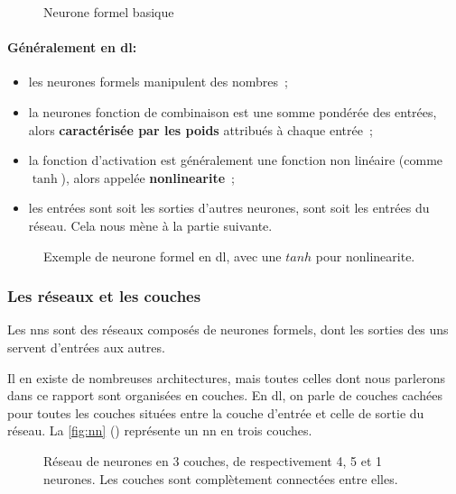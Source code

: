 \begin{figure}[h]
	\centering
	\scalebox{1}{}
	\caption{Neurone formel basique}
	\label{fig:formal_neuron}
\end{figure}

\paragraph{Généralement en \gls{dl}:}
\begin{itemize}
	\item les neurones formels manipulent des nombres~;
	\item la neurones fonction de combinaison est une somme pondérée des entrées, alors \textbf{caractérisée par les poids} attribués à chaque entrée~; \label{def:weight1}
	\item la fonction d'activation est généralement une fonction non linéaire (comme $\tanh$), alors appelée \textbf{\gls{nonlinearite}}~; \label{def:nonlinearite}
	\item les entrées sont soit les sorties d'autres neurones, sont soit les entrées du réseau. Cela nous mène à la partie suivante.
\end{itemize}

\begin{figure}[h]
	\centering
	\scalebox{1}{}
	\caption[Exemple de neurone formel en ]{Exemple de neurone formel en \gls{dl}, avec une $tanh$ pour \gls{nonlinearite}.}
	\label{fig:formal_neuron_dl}
\end{figure}

\subsubsection{Les réseaux et les couches\label{subsec:network}}
Les \glspl{nn} sont des réseaux composés de neurones formels, dont les sorties des uns servent d'entrées aux autres.

Il en existe de nombreuses architectures, mais toutes celles dont nous parlerons dans ce rapport sont organisées en couches.
En \gls{dl}, on parle de couches cachées pour toutes les couches situées entre la couche d'entrée et celle de sortie du réseau. La \autoref{fig:nn} () représente un \gls{nn} en trois couches.

\begin{figure}[h]
	\centering
	\scalebox{1}{}
	\caption[Réseau de neurones en 3 couches]{Réseau de neurones en 3 couches, de respectivement 4, 5 et 1 neurones. Les couches sont complètement connectées entre elles.}
	\label{fig:nn}
\end{figure}

